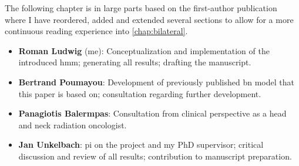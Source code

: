 \begin{tcolorbox}[
    title=\faIcon{users} Contributions,
    parbox=false,
    float
]
    The following chapter is in large parts based on the first-author publication \textbf{} \cite{ludwig_hidden_2021} where I have reordered, added and extended several sections to allow for a more continuous reading experience into \cref{chap:bilateral}.

    \begin{itemize}[leftmargin=5.5mm]
        \item[\faIcon{user}] \textbf{Roman Ludwig} (me): Conceptualization and implementation of the introduced \gls{hmm}; generating all results; drafting the manuscript.
        \item[\faIcon{user}] \textbf{Bertrand Poumayou}: Development of previously published \gls{bn} model \cite{pouymayou_bayesian_2019} that this paper is based on; consultation regarding further development.
        \item[\faIcon{user}] \textbf{Panagiotis Balermpas}: Consultation from clinical perspective as a head and neck radiation oncologist.
        \item[\faIcon{user}] \textbf{Jan Unkelbach}: \Gls{pi} on the project and my PhD supervisor; critical discussion and review of all results; contribution to manuscript preparation.
    \end{itemize}
\end{tcolorbox}
